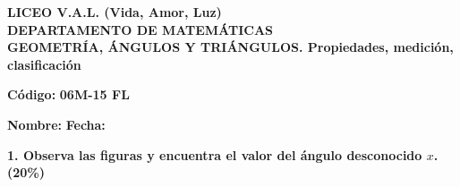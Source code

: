 \documentclass[12pt, letterpaper]{article}
\begin{document}
	
	\begin{center}
		{\Large \textbf{LICEO V.A.L. (Vida, Amor, Luz)}} \\
		\vspace{0.3cm}
		{\large \textbf{DEPARTAMENTO DE MATEMÁTICAS}} \\
		\vspace{0.3cm}
		{\large \textbf{GEOMETRÍA, ÁNGULOS Y TRIÁNGULOS. Propiedades, medición, clasificación}}
	\end{center}
	\vspace{0.3cm}
	
	\hfill \textbf{Código:} \textbf{06M-15 FL}
	
	\noindent \textbf{Nombre:} \underline{\hspace{8cm}} \hspace{1cm}\textbf{Fecha:} \underline{\hspace{3cm}}
	
	\vspace{2cm}
	
	\noindent \textbf{1. Observa las figuras y encuentra el valor del ángulo desconocido $x$.} \hfill\textbf{(20\%)}
	
\end{document}

